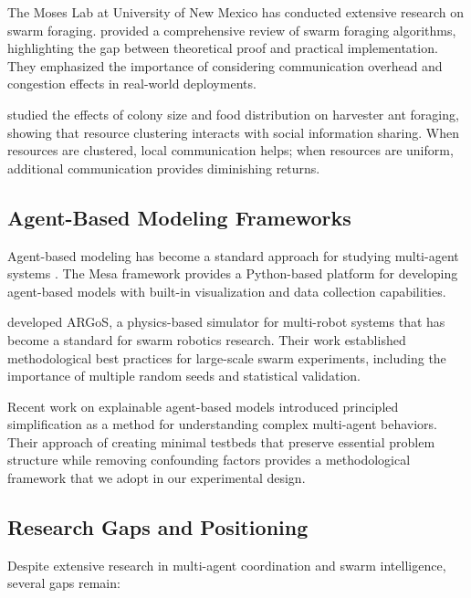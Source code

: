 \documentclass[12pt,a4paper]{article}
\begin{document}
The Moses Lab at University of New Mexico has conducted extensive research on swarm foraging. \textcite{lu2020swarm} provided a comprehensive review of swarm foraging algorithms, highlighting the gap between theoretical proof and practical implementation. They emphasized the importance of considering communication overhead and congestion effects in real-world deployments.

\textcite{flanagan2012quantifying} studied the effects of colony size and food distribution on harvester ant foraging, showing that resource clustering interacts with social information sharing. When resources are clustered, local communication helps; when resources are uniform, additional communication provides diminishing returns.

\subsection{Agent-Based Modeling Frameworks}

Agent-based modeling has become a standard approach for studying multi-agent systems \parencite{wilensky2015introduction}. The Mesa framework \parencite{masad2015mesa} provides a Python-based platform for developing agent-based models with built-in visualization and data collection capabilities.

\textcite{pinciroli2012argos} developed ARGoS, a physics-based simulator for multi-robot systems that has become a standard for swarm robotics research. Their work established methodological best practices for large-scale swarm experiments, including the importance of multiple random seeds and statistical validation.

Recent work on explainable agent-based models \parencite{barnes2021explaining} introduced principled simplification as a method for understanding complex multi-agent behaviors. Their approach of creating minimal testbeds that preserve essential problem structure while removing confounding factors provides a methodological framework that we adopt in our experimental design.

\subsection{Research Gaps and Positioning}

Despite extensive research in multi-agent coordination and swarm intelligence, several gaps remain:
\end{document}
